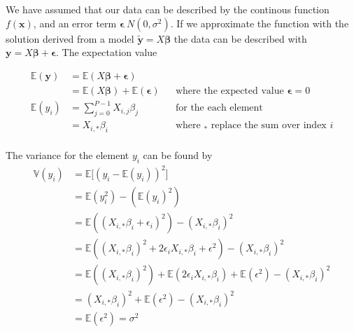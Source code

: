 \thispagestyle{plain}

We have assumed that our data can be described by the continous function 
$f(\boldsymbol{x})$, and an error term $\boldsymbol{\epsilon} ~ N(0, \sigma^{2})$. 
If we approximate the function with the solution derived from a model $\boldsymbol{\tilde{y}} = X\boldsymbol{\beta}$ the data can be described with $\boldsymbol{y} = X\boldsymbol{\beta} + \boldsymbol{\epsilon}$. 
The expectation value 

\begin{align*}
    \mathbb{E}(\boldsymbol{y}) &= \mathbb{E}(X\boldsymbol{\beta} + \boldsymbol{\epsilon}) \\
    &= \mathbb{E}(X\boldsymbol{\beta}) + \mathbb{E}(\boldsymbol{\epsilon}) && \text{where the expected value $\boldsymbol{\epsilon} = 0$} \\
    \mathbb{E}(y_{i}) &= \sum_{j=0}^{P-1} X_{i,j} \beta_{j} && \text{for the each element} \\
    &= X_{i,*} \beta_{i} && \text{where $_{*}$ replace the sum over index $i$} \\
\end{align*}


The variance for the element $y_{i}$ can be found by
\begin{align*}
    \mathbb{V}(y_{i}) &= \mathbb{E} \big[ (y_{i} - \mathbb{E}(y_{i}))^{2} \big] \\
    &= \mathbb{E} (y_{i}^{2}) - (\mathbb{E}(y_{i})^{2}) \\
    &= \mathbb{E} ((X_{i,*} \beta_{i} + \epsilon_{i})^{2}) - (X_{i,*} \beta_{i})^{2} \\
    &= \mathbb{E} ((X_{i,*} \beta_{i})^{2} + 2\epsilon_{i}X_{i,*} \beta_{i} + \epsilon^{2}) - (X_{i,*} \beta_{i})^{2} \\
    &= \mathbb{E} ((X_{i,*} \beta_{i})^{2}) + \mathbb{E} (2\epsilon_{i}X_{i,*} \beta_{i}) + \mathbb{E} (\epsilon^{2}) - (X_{i,*} \beta_{i})^{2} \\
    &= (X_{i,*} \beta_{i})^{2} + \mathbb{E} (\epsilon^{2}) - (X_{i,*} \beta_{i})^{2} \\
    &= \mathbb{E} (\epsilon^{2}) = \sigma^{2} \\
\end{align*}


